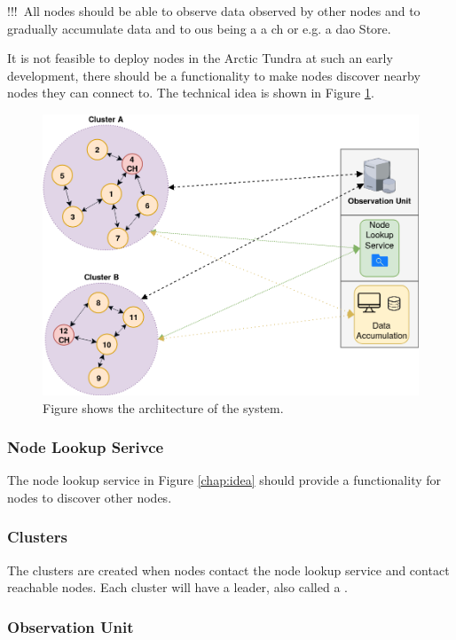 \documentclass[USenglish]{uit-thesis}
\begin{document}
!!!\
All nodes should be able to observe data observed by other nodes and to gradually accumulate data and to \gls{ou}s being a a \gls{ch} or e.g. a \gls{dao} Store.

It is not feasible to deploy nodes in the Arctic Tundra at such an early development, there should be a functionality to make nodes discover nearby nodes they can connect to. 
The technical idea is shown in Figure \ref{fig:idea}. 

\begin{figure}
\centering
\includegraphics[width=\textwidth]{idea.png}
\caption{Figure shows the architecture of the system.}
\label{fig:idea}
\end{figure}


\subsubsection{Node Lookup Serivce}
The node lookup service in Figure \ref{chap:idea} should provide a functionality for nodes to discover other nodes.

\subsubsection{Clusters}
The clusters are created when nodes contact the node lookup service and contact reachable nodes. Each cluster will have a leader, also called a .

\subsubsection{Observation Unit}
\end{document}
